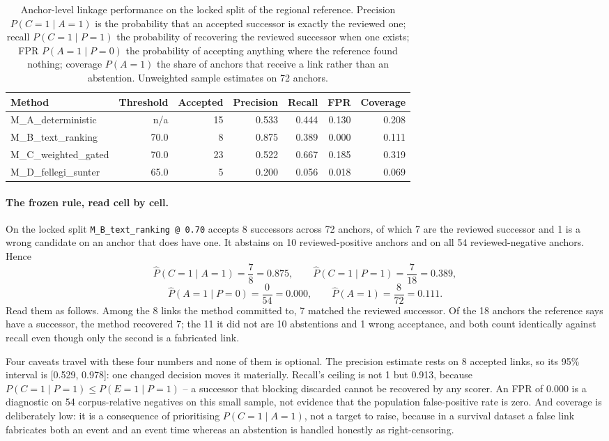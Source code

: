 \documentclass[11pt,a4paper]{article}
\newcommand{\code}[1]{\texttt{#1}}
\begin{document}
\begin{table}[H]
\centering
\small
\begin{tabularx}{\textwidth}{lrrrrrr}
\toprule
Method & Threshold & Accepted & Precision & Recall & FPR & Coverage \\
\midrule
M\_A\_deterministic & n/a & 15 & 0.533 & 0.444 & 0.130 & 0.208 \\
M\_B\_text\_ranking & 70.0 & 8 & 0.875 & 0.389 & 0.000 & 0.111 \\
M\_C\_weighted\_gated & 70.0 & 23 & 0.522 & 0.667 & 0.185 & 0.319 \\
M\_D\_fellegi\_sunter & 65.0 & 5 & 0.200 & 0.056 & 0.018 & 0.069 \\
\bottomrule
\end{tabularx}
\caption{Anchor-level linkage performance on the locked split of the regional
reference. Precision \(P(C=1\mid A=1)\) is the probability that an accepted
successor is exactly the reviewed one; recall \(P(C=1\mid P=1)\) the probability
of recovering the reviewed successor when one exists; FPR \(P(A=1\mid P=0)\) the
probability of accepting anything where the reference found nothing; coverage
\(P(A=1)\) the share of anchors that receive a link rather than an abstention.
Unweighted sample estimates on 72 anchors.}
\end{table}

\paragraph{The frozen rule, read cell by cell.} On the locked split
\code{M\_B\_text\_ranking @ 0.70} accepts
8 successors across
72 anchors, of which
7 are the reviewed successor and
1 is a wrong candidate on an anchor
that does have one. It abstains on 10
reviewed-positive anchors and on all
54 reviewed-negative anchors. Hence
\[
\hat{P}(C=1\mid A=1)=\frac{7}{8}=0.875,
\qquad
\hat{P}(C=1\mid P=1)=\frac{7}{18}=0.389,
\]
\[
\hat{P}(A=1\mid P=0)=\frac{0}{54}=0.000,
\qquad
\hat{P}(A=1)=\frac{8}{72}=0.111 .
\]
Read them as follows. Among the 8 links the method
committed to, 7 matched the reviewed successor. Of
the 18 anchors the reference says have a successor,
the method recovered 7; the
11 it did not are
10 abstentions and
1 wrong acceptance, and both count
identically against recall even though only the second is a fabricated link.

Four caveats travel with these four numbers and none of them is optional.
The precision estimate rests on 8 accepted links, so
its 95\% interval is [0.529, 0.978]: one
changed decision moves it materially. Recall's ceiling is not 1 but
0.913, because
\(P(C=1\mid P=1)\le P(E=1\mid P=1)\) -- a successor that blocking discarded
cannot be recovered by any scorer. An FPR of 0.000 is a diagnostic on
54 corpus-relative negatives on this small sample,
not evidence that the population false-positive rate is zero. And coverage is
deliberately low: it is a consequence of prioritising \(P(C=1\mid A=1)\), not a
target to raise, because in a survival dataset a false link fabricates both an
event and an event time whereas an abstention is handled honestly as
right-censoring.
\end{document}
